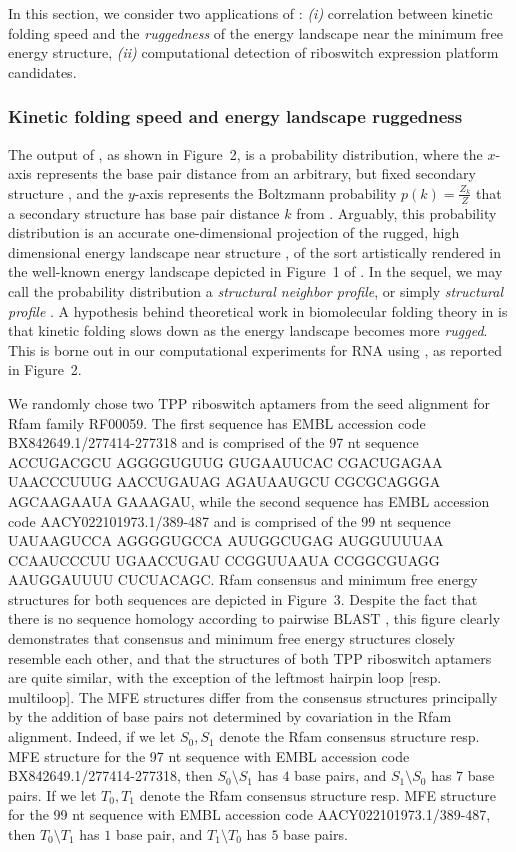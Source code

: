 In this section, we consider two applications of \fftbor:
{\em (i)} correlation between kinetic folding speed and the {\em ruggedness}
of the energy landscape near the minimum free energy structure,
{\em (ii)} computational detection of riboswitch
expression platform candidates.

\subsubsection*{Kinetic folding speed and energy landscape ruggedness}

The output of \fftbor, as shown in
Figure~2, is a probability distribution,
where the $x$-axis represents the base pair distance from an arbitrary,
but fixed secondary structure \strSt, and the $y$-axis represents the
Boltzmann probability $p(k) = \frac{Z_k}{Z}$ that a secondary structure
has base pair distance $k$ from \strSt. Arguably, this probability distribution
is an accurate one-dimensional projection of the rugged, high dimensional energy
landscape near structure \strSt,
of the sort artistically rendered in the well-known
energy landscape depicted in Figure~1  of \cite{Wolynes.ptam05}.
In the sequel, we may call the \fftbor probability distribution a
{\em structural neighbor profile}, or simply {\em structural profile}
\strSt.
A hypothesis behind theoretical work in biomolecular folding theory in
\cite{Bryngelson.p95}
is that kinetic folding slows down as the energy landscape becomes more
{\em rugged}. This is borne out in our computational experiments for RNA
using \fftbor, as reported
in Figure~2.

We randomly chose two TPP riboswitch
aptamers from the seed alignment for
Rfam family RF00059. The first sequence has EMBL accession code
BX842649.1/277414-277318 and is comprised of the 97 nt sequence
ACCUGACGCU AGGGGUGUUG GUGAAUUCAC CGACUGAGAA UAACCCUUUG AACCUGAUAG
AGAUAAUGCU CGCGCAGGGA AGCAAGAAUA GAAAGAU, while the second sequence
has EMBL accession code AACY022101973.1/389-487 and is comprised of the 99
nt sequence
UAUAAGUCCA AGGGGUGCCA AUUGGCUGAG AUGGUUUUAA CCAAUCCCUU
UGAACCUGAU CCGGUUAAUA CCGGCGUAGG AAUGGAUUUU CUCUACAGC.
Rfam consensus and minimum free energy structures for both sequences are
depicted in Figure~3.
Despite the fact that there is no sequence homology according to
pairwise BLAST \cite{BLAST}, this figure clearly demonstrates that
consensus and
minimum free energy structures closely resemble each other, and that the
structures of both TPP riboswitch aptamers are quite similar, with the
exception of the leftmost hairpin loop [resp. multiloop].
The MFE structures differ
from the consensus structures principally by the addition of base pairs not
determined by covariation in the Rfam alignment.
Indeed, if we let $S_0,S_1$
denote the Rfam consensus structure resp. MFE structure for the 97 nt
sequence with EMBL accession code BX842649.1/277414-277318, then
$S_0 \setminus S_1$ has $4$ base pairs, and $S_1\setminus S_0$ has $7$
base pairs. If we let $T_0,T_1$
denote the Rfam consensus structure resp. MFE structure for the 99 nt
sequence with EMBL accession code
AACY022101973.1/389-487, then
$T_0 \setminus T_1$ has $1$ base pair, and $T_1\setminus T_0$ has $5$
base pairs.

